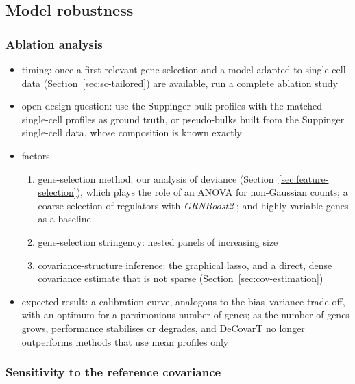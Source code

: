 \subsection{Model robustness}
\label{sec:robustness}

\subsubsection{Ablation analysis}
\label{app:ablation}

\begin{itemize}
  \item timing: once a first relevant gene selection and a model adapted to single-cell data
        (Section~\ref{sec:sc-tailored}) are available, run a complete ablation study
  \item open design question: use the Suppinger bulk profiles with the matched single-cell profiles as
        ground truth, or pseudo-bulks built from the Suppinger single-cell data, whose composition is
        known exactly \cite{suppingerMultimodalCharacterizationMurine2023}
  \item factors
  \begin{enumerate}[label=(\alph*)]
    \item gene-selection method: our analysis of deviance (Section~\ref{sec:feature-selection}), which
          plays the role of an ANOVA for non-Gaussian counts; a coarse selection of regulators with
          \emph{GRNBoost2} \cite{moermanGRNBoost2ArboretoEfficient2019}; and highly variable genes as a
          baseline \cite{hafemeisterNormalizationVarianceStabilization2019}
    \item gene-selection stringency: nested panels of increasing size
    \item covariance-structure inference: the graphical lasso, and a direct, dense covariance estimate
          that is not sparse \cite{schäferShrinkageApproachLargescale2005} (Section~\ref{sec:cov-estimation})
  \end{enumerate}
  \item expected result: a calibration curve, analogous to the bias--variance trade-off, with an optimum
        for a parsimonious number of genes; as the number of genes grows, performance stabilises or
        degrades, and DeCovarT no longer outperforms methods that use mean profiles only
\end{itemize}

\subsubsection{Sensitivity to the reference covariance}

